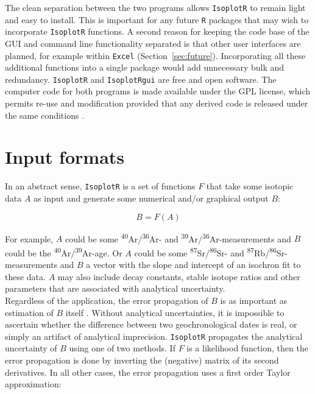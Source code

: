 \documentclass{article}
\begin{document}
The clean separation between the two programs allows \texttt{IsoplotR}
to remain light and easy to install. This is important for any future
\texttt{R} packages that may wish to incorporate \texttt{IsoplotR}
functions. A second reason for keeping the code base of the GUI and
command line functionality separated is that other user interfaces are
planned, for example within \texttt{Excel}
(Section~\ref{sec:future}). Incorporating all these additional
functions into a single package would add unnecessary bulk and
redundancy. \texttt{IsoplotR} and \texttt{IsoplotRgui} are free and
open software.  The computer code for both programs is made available
under the GPL license, which permits re-use and modification provided
that any derived code is released under the same conditions
\citep{gplv3}.

\section{Input formats}
\label{sec:input}

In an abstract sense, \texttt{IsoplotR} is a set of functions $F$ that
take some isotopic data $A$ as input and generate some numerical
and/or graphical output $B$:

\begin{equation}
  B = F(A)
  \label{eq:BFA}
\end{equation}

For example, $A$ could be some
\textsuperscript{40}Ar/\textsuperscript{36}Ar- and
\textsuperscript{39}Ar/\textsuperscript{36}Ar-measurements and $B$
could be the \textsuperscript{40}Ar/\textsuperscript{39}Ar-age. Or $A$
could be some \textsuperscript{87}Sr/\textsuperscript{86}Sr- and
\textsuperscript{87}Rb/\textsuperscript{86}Sr-measurements and $B$ a
vector with the slope and intercept of an isochron fit to these data.
$A$ may also include decay constants, stable isotope ratios and other
parameters that are associated with analytical uncertainty.\\


Regardless of the application, the error propagation of $B$ is as
important as estimation of $B$ itself \citep{ludwig2003}. Without
analytical uncertainties, it is impossible to ascertain whether the
difference between two geochronological dates is real, or simply an
artifact of analytical imprecision. \texttt{IsoplotR} propagates the
analytical uncertainty of $B$ using one of two methods. If $F$ is a
likelihood function, then the error propagation is done by inverting
the (negative) matrix of its second derivatives.  In all other cases,
the error propagation uses a first order Taylor approximation:
\end{document}
